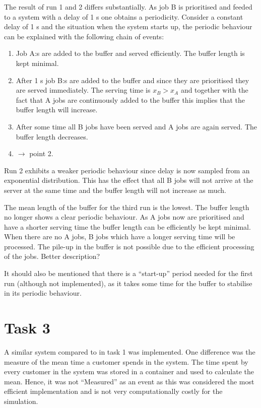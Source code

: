 \documentclass[]{article}
\begin{document}
The result of run 1 and 2 differs substantially.
As job B is prioritised and feeded to a system with a delay of 1 s one obtains a periodicity.
Consider a constant delay of 1 s and the situation when the system starts up, the periodic behaviour can be explained with the following chain of events:
\begin{enumerate}
  \item Job A:s are added to the buffer and served efficiently. The buffer length is kept minimal.
  \item After 1 s job B:s are added to the buffer and since they are prioritised they are served immediately. The serving time is $ x_B > x_A $ and together with the fact that A jobs are continuously added to the buffer this implies that the buffer length will increase.
  \item After some time all B jobs have been served and A jobs are again served. The buffer length decreases.
  \item $\rightarrow$ point 2.
\end{enumerate}
Run 2 exhibits a weaker periodic behaviour since delay is now sampled from an exponential distribution.
This has the effect that all B jobs will not arrive at the server at the same time and the buffer length will not increase as much.

The mean length of the buffer for the third run is the lowest.
The buffer length no longer shows a clear periodic behaviour.
As A jobs now are prioritised and have a shorter serving time the buffer length can be efficiently be kept minimal.
When there are no A jobs, B jobs which have a longer serving time will be processed.
The pile-up in the buffer is not possible due to the efficient processing of the jobs.
Better description?

It should also be mentioned that there is a ``start-up'' period needed for the first run (although not implemented), as it takes some time for the buffer to stabilise in its periodic behaviour.
\section{Task 3}
A similar system compared to in task 1 was implemented.
One difference was the measure of the mean time a customer spends in the system.
The time spent by every customer in the system was stored in a container and used to calculate the mean.
Hence, it was not ``Measured'' as an event as this was considered the most efficient implementation and is not very computationally costly for the simulation.
\end{document}

